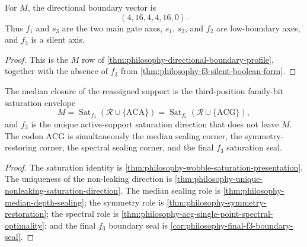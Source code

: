 \begin{corollary}
\label{cor:philosophy-gate-and-silent-axes}
For $M$, the directional boundary vector is
$$
  (4,16,4,4,16,0).
$$
Thus $f_{1}$ and $s_{3}$ are the two main gate axes, $s_{1}$, $s_{2}$,
and $f_{2}$ are low-boundary axes, and $f_{3}$ is a silent axis.
\end{corollary}
\begin{proof}
This is the $M$ row of
\autoref{thm:philosophy-directional-boundary-profile}, together with
the absence of $f_{3}$ from
\autoref{thm:philosophy-f3-silent-boolean-form}.
\end{proof}


\begin{theorem}
\label{thm:philosophy-wobble-saturation-closure}
The median closure of the reassigned support is the
third-position family-bit saturation envelope
$$
  M
  =
  \operatorname{Sat}_{f_{3}}(\mathcal{R}\cup\{\mathrm{ACA}\})
  =
  \operatorname{Sat}_{f_{3}}(\mathcal{R}\cup\{\mathrm{ACG}\}),
$$
and $f_{3}$ is the unique active-support saturation direction that does
not leave $M$. The codon $\mathrm{ACG}$ is simultaneously the median
sealing corner, the symmetry-restoring corner, the spectral sealing
corner, and the final $f_{3}$ saturation seal.
\end{theorem}
\begin{proof}
The saturation identity is
\autoref{thm:philosophy-wobble-saturation-presentation}. The uniqueness
of the non-leaking direction is
\autoref{thm:philosophy-unique-nonleaking-saturation-direction}. The
median sealing role is \autoref{thm:philosophy-median-depth-sealing};
the symmetry role is
\autoref{thm:philosophy-symmetry-restoration}; the spectral
role is \autoref{thm:philosophy-acg-single-point-spectral-optimality};
and the final $f_{3}$ boundary seal is
\autoref{cor:philosophy-final-f3-boundary-seal}.
\end{proof}
